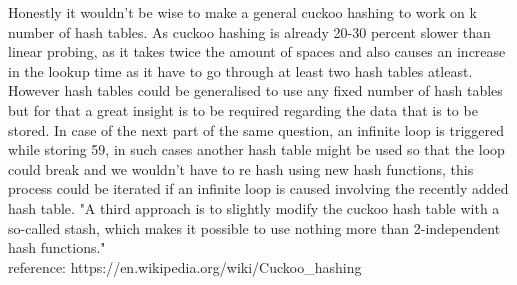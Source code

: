 \documentclass[addpoints]{exam}
\begin{document}
\begin{solution}
Honestly it wouldn't be wise to make a general cuckoo hashing to work on k number of hash tables. As cuckoo hashing is already 20-30 percent slower than linear probing, as it takes twice the amount of spaces and also causes an increase in the lookup time as it have to go through at least two hash tables atleast.\\
However hash tables could be generalised to use any fixed number of hash tables but for that a great insight is to be required regarding the data that is to be stored. In case of the next part of the same question, an infinite loop is triggered while storing 59, in such cases another hash table might be used so that the loop could break and we wouldn't have to re hash using new hash functions, this process could be iterated if an infinite loop is caused involving the recently added hash table. "A third approach is to slightly modify the cuckoo hash table with a so-called stash, which makes it possible to use nothing more than 2-independent hash functions."\\
reference: https://en.wikipedia.org/wiki/Cuckoo_hashing
\end{solution}
\end{document}
